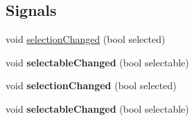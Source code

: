 \subsection*{Signals}
\begin{DoxyCompactItemize}
\item 
void \hyperlink{class_q_c_p_abstract_legend_item_a7cb61fdfbaf69c590bacb8f9e7099d9e}{selection\+Changed} (bool selected)
\item 
void {\bfseries selectable\+Changed} (bool selectable)\hypertarget{class_q_c_p_abstract_legend_item_abc4d779b938cc9235f9196737dbaa6bd}{}\label{class_q_c_p_abstract_legend_item_abc4d779b938cc9235f9196737dbaa6bd}

\item 
void {\bfseries selection\+Changed} (bool selected)\hypertarget{class_q_c_p_abstract_legend_item_a7cb61fdfbaf69c590bacb8f9e7099d9e}{}\label{class_q_c_p_abstract_legend_item_a7cb61fdfbaf69c590bacb8f9e7099d9e}

\item 
void {\bfseries selectable\+Changed} (bool selectable)\hypertarget{class_q_c_p_abstract_legend_item_abc4d779b938cc9235f9196737dbaa6bd}{}\label{class_q_c_p_abstract_legend_item_abc4d779b938cc9235f9196737dbaa6bd}

\end{DoxyCompactItemize}
